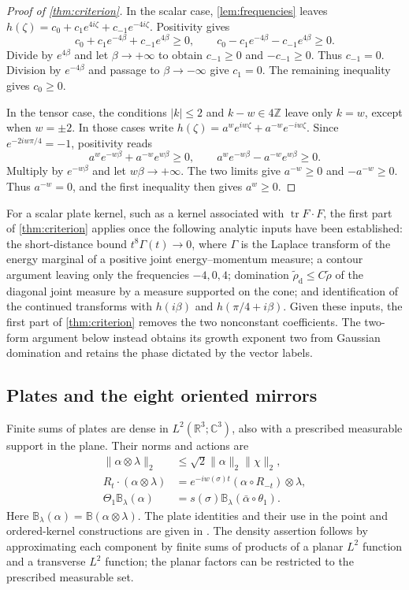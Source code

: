 \documentclass[11pt,letterpaper,reqno]{amsart}
\theoremstyle{definition}
\theoremstyle{remark}
\newcommand{\R}{\mathbb R}\newcommand{\C}{\mathbb C}
\newcommand{\Z}{\mathbb Z}\newcommand{\B}{\mathbb B}
\begin{document}
\begin{proof}[Proof of \cref{thm:criterion}]
In the scalar case, \cref{lem:frequencies} leaves
$h(\zeta)=c_0+c_1e^{4i\zeta}+c_{-1}e^{-4i\zeta}$. Positivity gives
\[
 c_0+c_1e^{-4\beta}+c_{-1}e^{4\beta}\ge0,\qquad
 c_0-c_1e^{-4\beta}-c_{-1}e^{4\beta}\ge0.
\]
Divide by $e^{4\beta}$ and let $\beta\to+\infty$ to obtain
$c_{-1}\ge0$ and $-c_{-1}\ge0$. Thus $c_{-1}=0$.
Division by $e^{-4\beta}$ and passage to $\beta\to-\infty$
give $c_1=0$. The remaining inequality gives $c_0\ge0$.

In the tensor case, the conditions $|k|\le2$ and $k-w\in4\Z$
leave only $k=w$, except when $w=\pm2$. In those cases write
$h(\zeta)=a^w e^{iw\zeta}+a^{-w}e^{-iw\zeta}$.
Since $e^{-2iw\pi/4}=-1$, positivity reads
\[
 a^w e^{-w\beta}+a^{-w}e^{w\beta}\ge0,\qquad
 a^w e^{-w\beta}-a^{-w}e^{w\beta}\ge0.
\]
Multiply by $e^{-w\beta}$ and let $w\beta\to+\infty$.
The two limits give $a^{-w}\ge0$ and $-a^{-w}\ge0$.
Thus $a^{-w}=0$, and the first inequality then gives $a^w\ge0$.
\end{proof}

For a scalar plate kernel, such as a kernel associated with
$\operatorname{tr}F\cdot F$, the first part of \cref{thm:criterion}
applies once the following analytic inputs have been established:
the short-distance bound
$t^8\Gamma(t)\to0$, where $\Gamma$ is the Laplace transform of the
energy marginal of a positive joint energy--momentum measure; a
contour argument leaving only the frequencies $-4,0,4$; domination
$\widetilde\rho_{\mathrm d}\le C\widetilde\rho$ of the diagonal
joint measure by a measure supported on the cone; and identification
of the continued transforms with $h(i\beta)$ and
$h(\pi/4+i\beta)$. Given these inputs, the first part of
\cref{thm:criterion} removes the two nonconstant coefficients.
The two-form argument below instead obtains its growth exponent two
from Gaussian domination and retains the phase dictated by the vector
labels.

\subsection{Plates and the eight oriented mirrors}

Finite sums of plates are dense in $L^2(\R^3;\C^3)$, also with a
prescribed measurable support in the plane. Their norms and actions are
\begin{align}
 \|\alpha\otimes\lambda\|_2&\le\sqrt2\|\alpha\|_2\|\chi\|_2,
 \label{eq:plate-norm}\\
 R_t\cdot(\alpha\otimes\lambda)&=
 e^{-iw(\sigma)t}(\alpha\circ R_{-t})\otimes\lambda,\label{eq:plate-rotation}\\
 \Theta_1\B_\lambda(\alpha)&=
 s(\sigma)\B_\lambda(\bar\alpha\circ\theta_1).
 \label{eq:plate-reflection}
\end{align}
Here $\B_\lambda(\alpha)=\B(\alpha\otimes\lambda)$.
The plate identities and their use in the point and ordered-kernel
constructions are given in \cite[Sections~8.2--8.3]{QEDCurrent}.
The density assertion follows by approximating each component by
finite sums of products of a planar $L^2$ function and a transverse
$L^2$ function; the planar factors can be restricted to the prescribed
measurable set.
\end{document}

